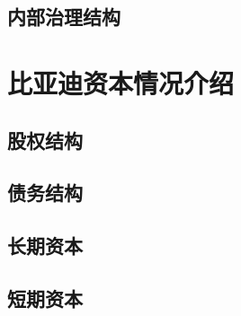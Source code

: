 \subsection{内部治理结构}

\section{比亚迪资本情况介绍}

\subsection{股权结构}


\subsection{债务结构}


\subsection{长期资本}


\subsection{短期资本}
